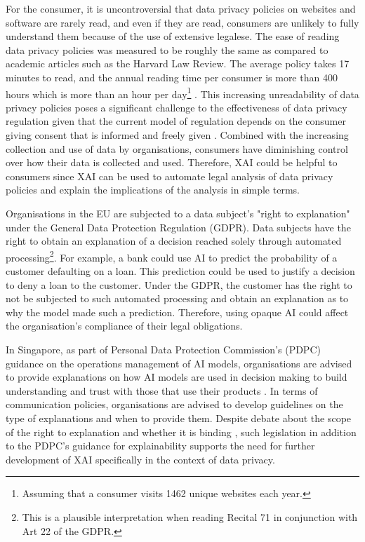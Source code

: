 For the consumer, it is uncontroversial that data privacy policies on websites and software are rarely read, and even if they are read, consumers are unlikely to fully understand them because of the use of extensive legalese. The ease of reading data privacy policies was measured to be roughly the same as compared to academic articles such as the Harvard Law Review. The average policy takes 17 minutes to read, and the annual reading time per consumer is more than 400 hours which is more than an hour per day\footnote{Assuming that a consumer visits 1462 unique websites each year.} \cite{wagner2022privacy}. This increasing unreadability of data privacy policies poses a significant challenge to the effectiveness of data privacy regulation given that the current model of regulation depends on the consumer giving consent that is informed and freely given \cite{mantelero_2014}. Combined with the increasing collection and use of data by organisations, consumers have diminishing control over how their data is collected and used. Therefore, XAI could be helpful to consumers since XAI can be used to automate legal analysis of data privacy policies and explain the implications of the analysis in simple terms.

Organisations in the EU are subjected to a data subject's "right to explanation" under the General Data Protection Regulation (GDPR). Data subjects have the right to obtain an explanation of a decision reached solely through automated processing\footnote{This is a plausible interpretation when reading Recital 71 in conjunction with Art 22 of the GDPR.}. For example, a bank could use AI to predict the probability of a customer defaulting on a loan. This prediction could be used to justify a decision to deny a loan to the customer. Under the GDPR, the customer has the right to not be subjected to such automated processing and obtain an explanation as to why the model made such a prediction. Therefore, using opaque AI could affect the organisation's compliance of their legal obligations.

In Singapore, as part of Personal Data Protection Commission's (PDPC) guidance on the operations management of AI models, organisations are advised to provide explanations on how AI models are used in decision making to build understanding and trust with those that use their products \cite{ai_modelframework}. In terms of communication policies, organisations are advised to develop guidelines on the type of explanations and when to provide them. Despite debate about the scope of the right to explanation and whether it is binding \cite{chesterman2021_transparency}, such legislation in addition to the PDPC's guidance for explainability supports the need for further development of XAI specifically in the context of data privacy. 


